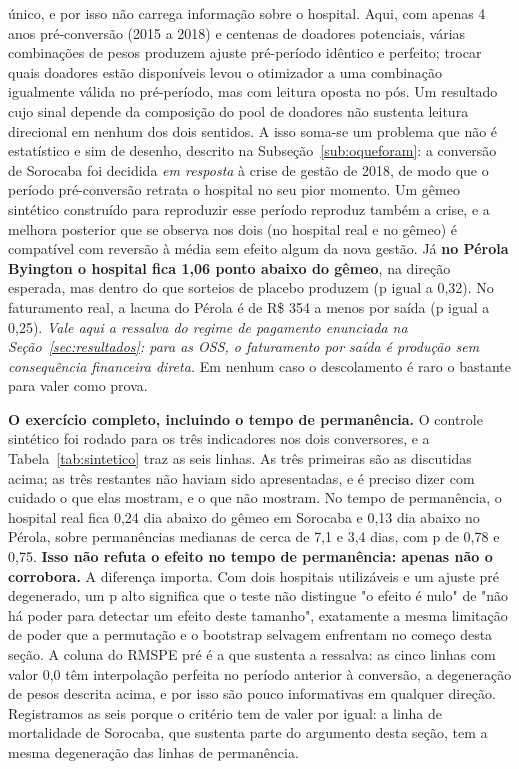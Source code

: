 único, e por isso não carrega informação sobre o hospital. Aqui, com
apenas 4 anos
pré-conversão (2015 a 2018) e centenas de doadores potenciais, várias
combinações de pesos produzem ajuste pré-período idêntico e perfeito;
trocar quais doadores estão disponíveis levou o otimizador a uma
combinação igualmente válida no pré-período, mas com leitura oposta no
pós. Um resultado cujo sinal depende da composição do pool de doadores
não sustenta leitura direcional em nenhum dos dois sentidos. A isso
soma-se um problema que não é estatístico e sim de desenho, descrito na
Subseção~\ref{sub:oqueforam}: a conversão de Sorocaba foi decidida
\emph{em resposta} à crise de gestão de 2018, de modo que o período
pré-conversão retrata o hospital no seu pior momento. Um gêmeo sintético
construído para reproduzir esse período reproduz também a crise, e a
melhora posterior que se observa nos dois (no hospital real e no
gêmeo) é compatível com reversão à média sem efeito algum da nova
gestão. Já
\textbf{no Pérola Byington o hospital
fica 1,06 ponto abaixo do gêmeo}, na direção esperada, mas dentro do
que sorteios de placebo produzem (p igual a 0,32). No faturamento real, a
lacuna do Pérola é de R\$ 354 a menos por saída (p igual a 0,25).
\textit{Vale aqui a ressalva do regime de pagamento enunciada na
Seção~\ref{sec:resultados}: para as OSS, o faturamento por saída é
produção sem consequência financeira direta.} Em nenhum caso o descolamento é raro o bastante para
valer como prova.

\newpage
\textbf{O exercício completo, incluindo o tempo de permanência.} O
controle sintético foi rodado para os três indicadores nos dois
conversores, e a Tabela~\ref{tab:sintetico} traz as seis linhas. As
três primeiras são as discutidas acima; as três restantes não haviam
sido apresentadas, e é preciso dizer com cuidado o que elas mostram, e
o que não mostram. No tempo de permanência, o hospital real fica
0,24 dia abaixo do gêmeo em Sorocaba e 0,13 dia abaixo no Pérola, sobre
permanências medianas de cerca de 7,1 e 3,4 dias, com p de 0,78 e 0,75.
\textbf{Isso não refuta o efeito no tempo de permanência: apenas não o
corrobora.} A diferença importa. Com dois hospitais utilizáveis e um
ajuste pré degenerado, um p alto significa que o teste não distingue
"o efeito é nulo" de "não há poder para detectar um efeito deste
tamanho", exatamente a mesma limitação de poder que a permutação e o
bootstrap selvagem enfrentam no começo desta seção. A coluna do RMSPE
pré é a que sustenta a ressalva: as cinco linhas com valor 0,0 têm
interpolação perfeita no período anterior à conversão, a degeneração de
pesos descrita acima, e por isso são pouco informativas em qualquer
direção. Registramos as seis porque o critério tem de valer por igual:
a linha de mortalidade de Sorocaba, que sustenta parte do argumento
desta seção, tem a mesma degeneração das linhas de permanência.

